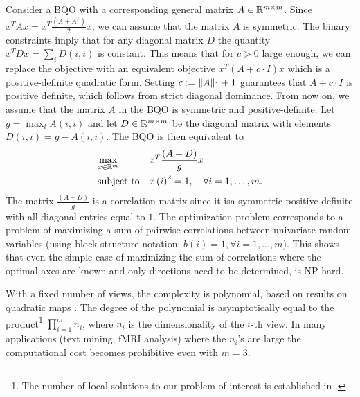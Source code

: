  Consider a BQO with a corresponding general matrix $A \in \mathbb{R}^{m\times m}$. Since $x^T A x = x^T
\frac{\left(A + A^T\right)}{2} x$, we can assume that the matrix $A$ is
symmetric. The binary constraints imply that for any diagonal
matrix $D$ the quantity $x^T D x = \sum_i D\left(i,i\right)$ is
constant. This means that for $c > 0$ large enough, we can
replace the objective with an equivalent objective $x^T \left(A + c
\cdot I\right) x$ which is a positive-definite quadratic form. Setting $c := \lVert A\rVert_1 + 1$ guarantees that $A + c\cdot I$ is positive definite, which follows from strict diagonal dominance. From
now on, we assume that the matrix $A$ in the BQO is symmetric and
positive-definite.  Let $g = \max_i{A\left(i,i\right)}$ and let $D \in
\mathbb{R}^{m\times m}$ be the diagonal matrix with elements $D\left(i,i\right) = g -
A\left(i,i\right)$. The BQO is then equivalent to
\begin{equation}\label{eq:binqpcor}
\begin{aligned}
& \underset{x \in \mathbb{R}^m}{\text{max}}
& & x^T \frac{\left(A + D\right)}{g} x  \\
& \text{subject to}
& & x\left(i\right)^2 = 1,  \quad\forall i =1,\ldots,m.\\
\end{aligned}
\end{equation}
The matrix $\frac{\left(A + D\right)}{g}$ is a correlation matrix since it
isa symmetric positive-definite with all diagonal entries
equal to $1$. The optimization problem corresponds to a problem
of maximizing a sum of pairwise correlations between univariate
random variables (using block structure notation: $b\left(i\right) = 1,
\forall i = 1,\ldots, m$). This shows that even the simple case
of maximizing the sum of correlations where the optimal axes are
known and only directions need to be determined, is NP-hard.

With a fixed number of views, the complexity is polynomial, based on results on quadratic maps \cite{Grigoriev}. The degree of the polynomial is asymptotically equal to the product\footnote{The number of local solutions to our problem of interest is established in \cite{Chu}.} $\prod_{i=1}^m n_i$, where $n_i$ is the dimensionality of the $i$-th view.
In many applications (text mining, fMRI analysis) where the $n_i$'s are large the computational cost becomes prohibitive even with $m=3$.



